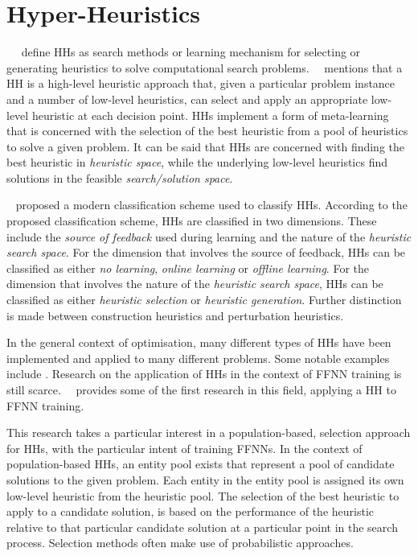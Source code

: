 \section{Hyper-Heuristics}
\label{sec:hhs}

~\citeauthor{ref:burke:2010}~\cite{ref:burke:2010} define \acp{HH} as search methods or learning mechanism for selecting or generating heuristics to solve computational search problems.~\citeauthor{ref:burke:2003}~\cite{ref:burke:2003} mentions that a \acs{HH} is a high-level heuristic approach that, given a particular problem instance and a number of low-level heuristics, can select and apply an appropriate low-level heuristic at each decision point. \acp{HH} implement a form of meta-learning that is concerned with the selection of the best heuristic from a pool of heuristics to solve a given problem. It can be said that \acp{HH} are concerned with finding the best heuristic in \textit{heuristic space}, while the underlying low-level heuristics find solutions in the feasible \textit{search/solution space}.

\citeauthor{ref:burke:2010}~\cite{ref:burke:2010} proposed a modern classification scheme used to classify \acp{HH}. According to the proposed classification scheme, \acp{HH} are classified in two dimensions. These include the \textit{source of feedback} used during learning and the nature of the \textit{heuristic search space}. For the dimension that involves the source of feedback, \acp{HH} can be classified as either \textit{no learning}, \textit{online learning} or \textit{offline learning}. For the dimension that involves the nature of the \textit{heuristic search space}, \acp{HH} can be classified as either \textit{heuristic selection} or \textit{heuristic generation}. Further distinction is made between construction heuristics and perturbation heuristics.

In the general context of optimisation, many different types of \acp{HH} have been implemented and applied to many different problems. Some notable examples include \cite{ref:dowsland:2007, ref:burke:2010, ref:grobler:2012, ref:vanderstockt:2018}. Research on the application of \acp{HH} in the context of \acs{FFNN} training is still scarce.~\citeauthor{ref:nel:2021}~\cite{ref:nel:2021} provides some of the first research in this field, applying a \acs{HH} to \acs{FFNN} training.

This research takes a particular interest in a population-based, selection approach for \acp{HH}, with the particular intent of training \acp{FFNN}. In the context of population-based \acp{HH}, an entity pool exists that represent a pool of candidate solutions to the given problem. Each entity in the entity pool is assigned its own low-level heuristic from the heuristic pool. The selection of the best heuristic to apply to a candidate solution, is based on the performance of the heuristic relative to that particular candidate solution at a particular point in the search process. Selection methods often make use of probabilistic approaches.